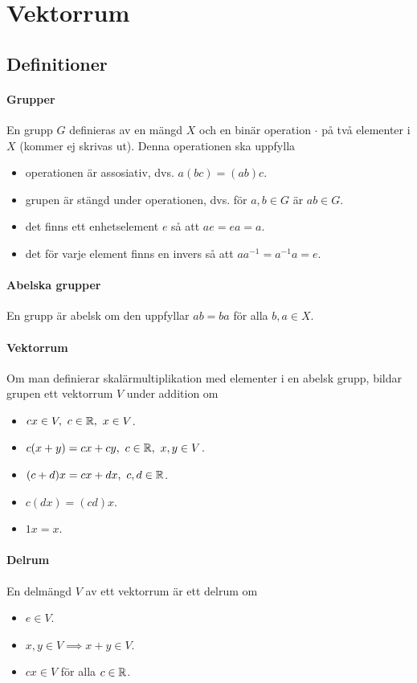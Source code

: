 \section{Vektorrum}

\subsection{Definitioner}

\paragraph{Grupper}
En grupp $G$ definieras av en mängd $X$ och en binär operation $\cdot$ på två elementer i $X$ (kommer ej skrivas ut). Denna operationen ska uppfylla
\begin{itemize}
	\item operationen är assosiativ, dvs. $a(bc) = (ab)c$.
	\item grupen är stängd under operationen, dvs. för $a, b\in G$ är $ab\in G$.
	\item det finns ett enhetselement $e$ så att $ae = ea = a$.
	\item det för varje element finns en invers så att $aa^{-1} = a^{-1}a = e$.
\end{itemize}

\paragraph{Abelska grupper}
En grupp är abelsk om den uppfyllar $ab = ba$ för alla $b, a\in X$.

\paragraph{Vektorrum}
Om man definierar skalärmultiplikation med elementer i en abelsk grupp, bildar grupen ett vektorrum $V$ under addition om
\begin{itemize}
	\item $cx\in V,~c\in\mathbb{R},~x\in V$.
	\item $c(x + y) = cx + cy,~c\in\mathbb{R},~x,y\in V$.
	\item $(c + d)x = cx + dx,~c,d\in\mathbb{R}$.
	\item $c(dx) = (cd)x$.
	\item $1x = x$.
\end{itemize}

\paragraph{Delrum}
En delmängd $V$ av ett vektorrum är ett delrum om
\begin{itemize}
	\item $e\in V$.
	\item $x, y\in V\implies x + y\in V$.
	\item $cx\in V$ för alla $c\in\mathbb{R}$.
\end{itemize}

